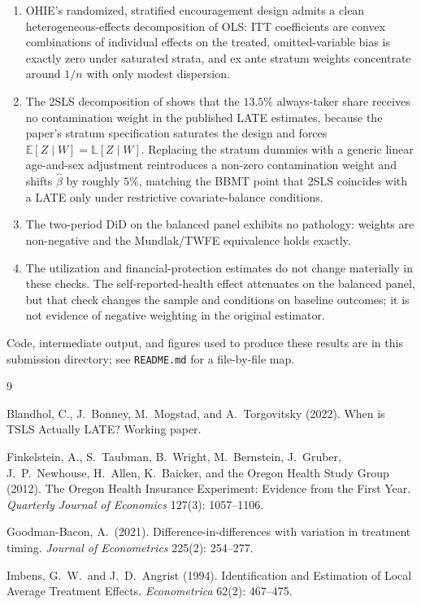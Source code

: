 \documentclass[11pt]{article}
\newcommand{\E}{\mathbb{E}}
\newcommand{\Lproj}{\mathbb{L}}
\begin{document}
\begin{enumerate}[leftmargin=*,itemsep=2pt]
    \item OHIE's randomized, stratified encouragement design admits a
        clean heterogeneous-effects decomposition of OLS: ITT
        coefficients are convex combinations of individual effects on
        the treated, omitted-variable bias is exactly zero under
        saturated strata, and ex ante stratum weights concentrate
        around $1/n$ with only modest dispersion.
    \item The 2SLS decomposition of \citet{BBMT2022} shows that the
        $13.5\%$ always-taker share receives no contamination weight in
        the published LATE estimates, because the paper's stratum
        specification saturates the design and forces
        $\E[Z\mid W]=\Lproj[Z\mid W]$. Replacing the stratum dummies
        with a generic linear age-and-sex adjustment reintroduces a
        non-zero contamination weight and shifts $\hat\beta$ by
        roughly $5\%$, matching the BBMT point that 2SLS coincides
        with a LATE only under restrictive
        covariate-balance conditions.
    \item The two-period DiD on the balanced panel exhibits no
        \citet{GB2021} pathology: weights are non-negative and the
        Mundlak/TWFE equivalence holds exactly.
    \item The utilization and financial-protection estimates do not
        change materially in these checks. The self-reported-health
        effect attenuates on the balanced panel, but that check changes
        the sample and conditions on baseline outcomes; it is not
        evidence of negative weighting in the original estimator.
\end{enumerate}

Code, intermediate output, and figures used to produce these results
are in this submission directory; see \texttt{README.md} for a
file-by-file map.

\begin{thebibliography}{9}\small

Blandhol, C., J.\ Bonney, M.\ Mogstad, and A.\ Torgovitsky (2022).
When is TSLS Actually LATE? Working paper.

Finkelstein, A., S.\ Taubman, B.\ Wright, M.\ Bernstein, J.\ Gruber,
J.\ P.\ Newhouse, H.\ Allen, K.\ Baicker, and the Oregon Health Study
Group (2012). The Oregon Health Insurance Experiment: Evidence from
the First Year. \emph{Quarterly Journal of Economics} 127(3):
1057--1106.

Goodman-Bacon, A.\ (2021). Difference-in-differences with variation
in treatment timing. \emph{Journal of Econometrics} 225(2): 254--277.

Imbens, G.\ W.\ and J.\ D.\ Angrist (1994). Identification and
Estimation of Local Average Treatment Effects. \emph{Econometrica}
62(2): 467--475.
\end{thebibliography}
\end{document}
